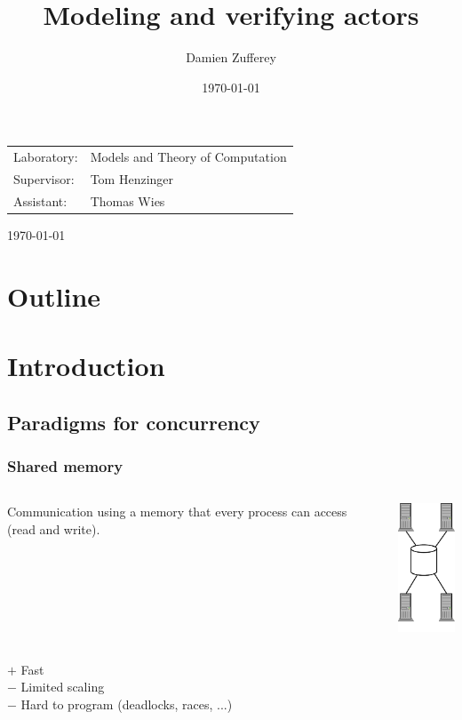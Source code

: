 \documentclass{beamer}
\title[Verifying actors]{Modeling and verifying \scala{} actors}
\author{ Damien Zufferey}
\institute{
  \'Ecole Polytechnique F\'ed\'erale de Lausanne
}
\date{\today}
\begin{document}
\begin{frame}[plain]
\begin{center}

{\Large
\inserttitle
}

\vspace{10mm}

\insertauthor

\vspace{5mm}

{\footnotesize
\insertinstitute

\vspace{2mm}

\begin{tabular}{ll}
Laboratory: & Models and Theory of Computation\\
Supervisor: & Tom Henzinger\\
Assistant: & Thomas Wies
\end{tabular}
}

\vspace{8mm}
\small
\today
\end{center}
\end{frame}

\section*{Outline}
\begin{frame}
\tableofcontents
\end{frame}

\section{Introduction}

\subsection{Paradigms for concurrency}

\begin{frame}
  \frametitle{Shared memory}
  
  \begin{columns}
  \column{5cm}
  Communication using a memory that every process can access (read and write).

  \column{5cm}
  \centering
  \includegraphics[width=2cm]{shared}
  \end{columns}

  $+$ Fast \\
  $-$ Limited scaling \\
  $-$ Hard to program (deadlocks, races, ...)
\end{frame}
\end{document}
